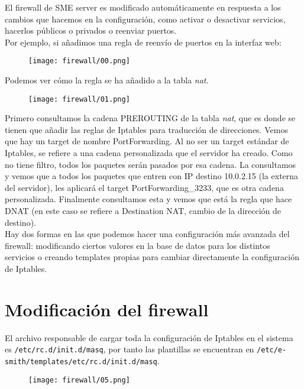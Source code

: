 El firewall de SME server es modificado automáticamente en respuesta a los cambios que hacemos en la configuración, como activar o desactivar servicios, hacerlos públicos o privados o reenviar puertos.\\

Por ejemplo, si añadimos una regla de reenvío de puertos en la interfaz web:

\begin{figure}[H]
    \centering
    \texttt{[image: firewall/00.png]}
\end{figure}

Podemos ver cómo la regla se ha añadido a la tabla \textit{nat}.

\begin{figure}[H]
    \centering
    \texttt{[image: firewall/01.png]}
\end{figure}

Primero consultamos la cadena PREROUTING de la tabla \textit{nat}, que es donde se tienen que añadir las reglas de Iptables para traducción de direcciones. Vemos que hay un target de nombre PortForwarding. Al no ser un target estándar de Iptables, se refiere a una cadena personalizada que el servidor ha creado. Como no tiene filtro, todos los paquetes serán pasados por esa cadena. La consultamos y vemos que a todos los paquetes que entren con IP destino 10.0.2.15 (la externa del servidor), les aplicará el target PortForwarding\_3233, que es otra cadena personalizada. Finalmente consultamos esta y vemos que está la regla que hace DNAT (en este caso se refiere a Destination NAT, cambio de la dirección de destino).\\

Hay dos formas en las que podemos hacer una configuración más avanzada del firewall: modificando ciertos valores en la base de datos para los distintos servicios o creando templates propias para cambiar directamente la configuración de Iptables.

\section{Modificación del firewall}

El archivo responsable de cargar toda la configuración de Iptables en el sistema es \lstinline!/etc/rc.d/init.d/masq!, por tanto las plantillas se encuentran en \lstinline!/etc/e-smith/templates/etc/rc.d/init.d/masq!.

\begin{figure}[H]
    \centering
    \texttt{[image: firewall/05.png]}
\end{figure}

